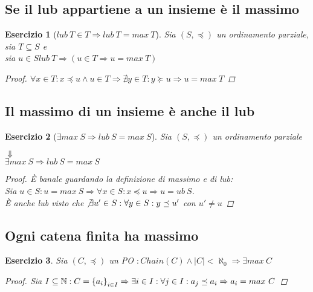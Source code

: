 \theoremstyle{definizione}
\newtheorem{esercizio}{Esercizio}


\subsection{Se il lub appartiene a un insieme è il massimo}
\begin{esercizio}[$lub\ T \in T \Rightarrow lub\ T = max\ T$]
  Sia $(S, \preceq)$ un ordinamento parziale, sia $T \subseteq S$ e\\
  sia $u \in S lub\ T \Rightarrow (u \in T \Rightarrow u = max\ T)$
  \begin{proof}
    $\forall x \in T : x \preceq u \land u \in T \Rightarrow \nexists y \in T : y \succeq u \Rightarrow u = max\ T$
  \end{proof}
\end{esercizio}

\subsection{Il massimo di un insieme è anche il lub}
\begin{esercizio}[$\exists max\ S \Rightarrow lub\ S = max\ S$]
  Sia $(S, \preceq)$ un ordinamento parziale
  \begin{center}
    $\Downarrow$\\
    $\exists max\ S \Rightarrow lub\ S = max\ S$
  \end{center}
  \begin{proof}
    È banale guardando la definizione di massimo e di lub:\\
    Sia $u \in S : u = max\ S \Rightarrow \forall x \in S : x \preceq u \Rightarrow u = ub\ S$.\\
    È anche lub visto che $\not \exists u' \in S : \forall y \in S : y \preceq u'$ con $ u' \neq u$
  \end{proof}
\end{esercizio}

\subsection{Ogni catena finita ha massimo}
\begin{esercizio}
  Sia $(C, \preceq)$ un \emph{PO} $: Chain(C) \land |C| < \aleph_0 \Rightarrow \exists max\ C$
  \begin{proof}
    Sia I $\subseteq \mathbb{N} : C = \left\{a_i\right\}_{i \in I} \Rightarrow \exists i \in I : \forall j \in I : a_j \preceq a_i \Rightarrow a_i = max\ C$
    \end{proof}
\end{esercizio}

